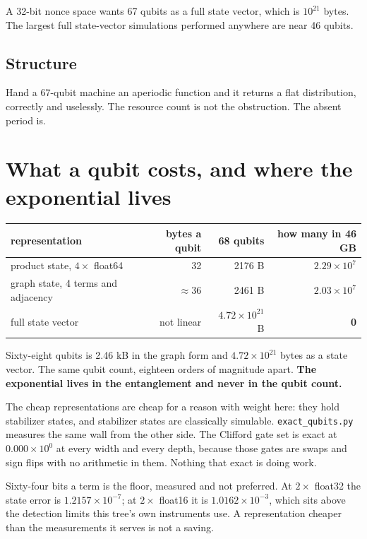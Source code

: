A 32-bit nonce space wants 67 qubits as a full state vector, which is \(10^{21}\) bytes. The largest
full state-vector simulations performed anywhere are near 46 qubits.

\subsection{Structure}

Hand a 67-qubit machine an aperiodic function and it returns a flat distribution, correctly and
uselessly. The resource count is not the obstruction. The absent period is.

\section{What a qubit costs, and where the exponential lives}

\begin{center}
\begin{tabular}{lrrr}
\toprule
representation & bytes a qubit & 68 qubits & how many in 46 GB \\
\midrule
product state, \(4 \times\) float64 & 32 & 2176 B & \(2.29 \times 10^{7}\) \\
graph state, 4 terms and adjacency & \(\approx 36\) & 2461 B & \(2.03 \times 10^{7}\) \\
full state vector & not linear & \(4.72 \times 10^{21}\) B & \textbf{0} \\
\bottomrule
\end{tabular}
\end{center}

Sixty-eight qubits is 2.46 kB in the graph form and \(4.72 \times 10^{21}\) bytes as a state vector.
The same qubit count, eighteen orders of magnitude apart. \textbf{The exponential lives in the
entanglement and never in the qubit count.}

The cheap representations are cheap for a reason with weight here: they hold stabilizer states, and
stabilizer states are classically simulable. \texttt{exact\_qubits.py} measures the same wall from
the other side. The Clifford gate set is exact at \(0.000 \times 10^{0}\) at every width and every
depth, because those gates are swaps and sign flips with no arithmetic in them. Nothing that exact
is doing work.

Sixty-four bits a term is the floor, measured and not preferred. At \(2 \times\)
float32 the state error is \(1.2157 \times 10^{-7}\); at \(2 \times\) float16 it is
\(1.0162 \times 10^{-3}\), which sits above the detection limits this tree's own instruments use. A
representation cheaper than the measurements it serves is not a saving.

